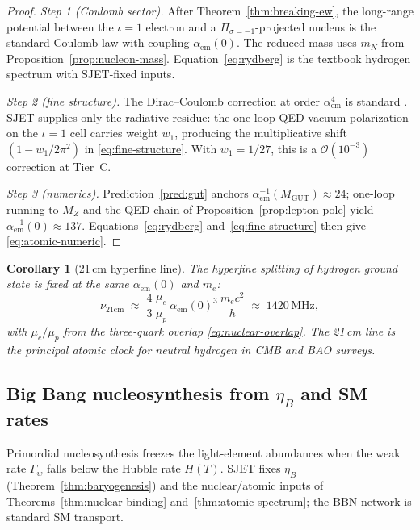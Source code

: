 \documentclass[11pt]{article}
\theoremstyle{plain}
\newtheorem{corollary}[theorem]{Corollary}
\theoremstyle{definition}
\theoremstyle{remark}
\numberwithin{equation}{section}
\begin{document}
\begin{proof}
\emph{Step 1 (Coulomb sector).}
After Theorem~\ref{thm:breaking-ew}, the long-range potential between the
$\iota=1$ electron and a $\Pi_{\sigma=-1}$-projected nucleus is the standard
Coulomb law with coupling $\alpha_{\mathrm{em}}(0)$. The reduced mass uses
$m_N$ from Proposition~\ref{prop:nucleon-mass}. Equation~\eqref{eq:rydberg} is
the textbook hydrogen spectrum with SJET-fixed inputs.

\emph{Step 2 (fine structure).}
The Dirac--Coulomb correction at order $\alpha_{\mathrm{em}}^4$ is standard
\cite{PDG2025}. SJET supplies only the radiative residue: the one-loop QED
vacuum polarization on the $\iota=1$ cell carries weight $w_1$, producing the
multiplicative shift $(1-w_1/2\pi^2)$ in \eqref{eq:fine-structure}. With
$w_1=1/27$, this is a $\mathcal{O}(10^{-3})$ correction at Tier~C.

\emph{Step 3 (numerics).}
Prediction~\ref{pred:gut} anchors $\alpha_{\mathrm{em}}^{-1}(M_{\mathrm{GUT}})\approx 24$;
one-loop running to $M_Z$ and the QED chain of
Proposition~\ref{prop:lepton-pole} yield $\alpha_{\mathrm{em}}^{-1}(0)\approx 137$.
Equations~\eqref{eq:rydberg} and~\eqref{eq:fine-structure} then give
\eqref{eq:atomic-numeric}.
\end{proof}

\begin{corollary}[21\,cm hyperfine line]\label{cor:hyperfine}
The hyperfine splitting of hydrogen ground state is fixed at the same
$\alpha_{\mathrm{em}}(0)$ and $m_e$:
\begin{equation}\label{eq:hyperfine}
  \nu_{21\mathrm{cm}}
  \;\approx\;
  \frac{4}{3}\,
  \frac{\mu_e}{\mu_p}\,
  \alpha_{\mathrm{em}}(0)^3\,
  \frac{m_e c^2}{h}
  \;\approx\;
  1420\,\mathrm{MHz},
\end{equation}
with $\mu_e/\mu_p$ from the three-quark overlap \eqref{eq:nuclear-overlap}.
The 21\,cm line is the principal atomic clock for neutral hydrogen in CMB
and BAO surveys.
\end{corollary}

\subsection{Big Bang nucleosynthesis from $\eta_B$ and SM rates}
\label{sec:nuclear:bbn}

Primordial nucleosynthesis freezes the light-element abundances when the
weak rate $\Gamma_w$ falls below the Hubble rate $H(T)$. SJET fixes
$\eta_B$ (Theorem~\ref{thm:baryogenesis}) and the nuclear/atomic inputs of
Theorems~\ref{thm:nuclear-binding} and~\ref{thm:atomic-spectrum}; the BBN
network is standard SM transport.
\end{document}
